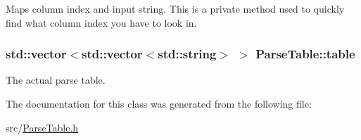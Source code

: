 \-Maps column index and input string. \-This is a private method used to quickly find what column index you have to look in. 

\hypertarget{classParseTable_a0dbd87ee0d018de6bb990e1ffd8ac26d}{
\subsubsection[{table}]{\setlength{\rightskip}{0pt plus 5cm}std\-::vector$<$std\-::vector$<$std\-::string$>$ $>$ {\bf \-Parse\-Table\-::table}}}\label{d9/da1/classParseTable_a0dbd87ee0d018de6bb990e1ffd8ac26d}


\-The actual parse table. 



\-The documentation for this class was generated from the following file\-:\begin{DoxyCompactItemize}
\item 
src/\hyperlink{ParseTable_8h}{\-Parse\-Table.\-h}\end{DoxyCompactItemize}
